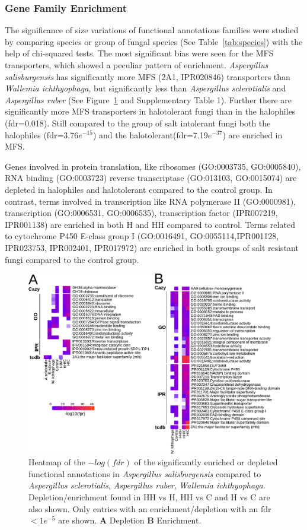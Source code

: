 \documentclass[jof,article,submit,moreauthors,pdftex,10pt,a4paper]{Definitions/mdpi}
\newcommand{\aspRub}{\textit{Aspergillus ruber}}
\newcommand{\walIch}{\textit{Wallemia ichthyophaga}}
\newcommand{\phiSp}{\textit{Aspergillus salisburgensis}}
\newcommand{\phiScl}{\textit{Aspergillus sclerotialis}}
\begin{document}
\subsubsection{Gene Family Enrichment}

The significance of size variations of functional annotations families were studied  by comparing species or group of fungal species (See Table~\ref{tab:species}) with the help of chi-squared tests.
The most significant bias were seen for the MFS transporters, which showed a peculiar pattern of enrichment. \phiSp{} has significantly more MFS (2A1, IPR020846) transporters than \walIch{}, but significantly less than \phiScl{} and \aspRub{} (See Figure~\ref{fig:ovun} and Supplementary Table 1). Further there are significantly more MFS transporters in halotolerant fungi than in the halophiles (fdr=0.018). Still compared to the group of salt intolerant fungi both the halophiles (fdr=3.76$e^{-15}$) and the halotolerant(fdr=7.19$e^{-37}$) are enriched in MFS. 

Genes involved in protein translation, like ribosomes (GO:0003735, GO:0005840), RNA binding (GO:0003723)  reverse transcriptase (GO:013103, GO:0015074) are depleted in halophiles and halotolerant compared to the control group. In contrast, terms involved in transcription like RNA polymerase II (GO:0000981), transcription (GO:0006531, GO:0006535), transcription factor (IPR007219, IPR001138) are enriched in both H and HH compared to control. Terms related to cytochrome P450 E-class group I (GO:0016491, GO:0055114,IPR001128, IPR023753, IPR002401, IPR017972) are enriched in both groups of salt resistant fungi compared to the control group. 

\begin{figure}[htbp]
    \centering
    \includegraphics[width=\linewidth]{over_under_final.pdf}
    \caption{\label{fig:ovun} Heatmap of the $-log(fdr)$ of the significantly enriched or depleted functional annotations in {\phiSp} compared to  {\phiScl}, {\aspRub}, {\walIch}. Depletion/enrichment found in HH vs H, HH vs C and H vs C are also shown. Only entries with an enrichment/depletion with an fdr$<1e^{-5}$ are shown. \textbf{A} Depletion \textbf{B} Enrichment.
    }
\end{figure}
\end{document}
